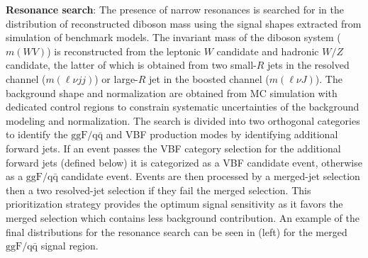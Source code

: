\textbf{Resonance search}: The presence of narrow resonances is searched for in the distribution of reconstructed diboson mass 
using the signal shapes extracted from simulation of benchmark models.
The invariant mass of the diboson system ($m(WV)$) is reconstructed from the leptonic $W$ candidate and hadronic $W/Z$ candidate, 
the latter of which is obtained from two small-$R$ jets in the resolved channel ($m(\ell\nu jj)$) or large-$R$ jet in the boosted 
channel ($m(\ell\nu J)$). 
The background shape and normalization are obtained from MC simulation with dedicated control regions to
constrain systematic uncertainties of the background modeling and normalization.
The search is divided into two orthogonal categories to identify the $\mathrm{ggF/q\bar{q}}$ and VBF production modes 
by identifying additional forward jets. If an event passes the VBF category selection for the additional forward jets 
(defined below) it is categorized as a VBF candidate event, otherwise as a $\mathrm{ggF/q\bar{q}}$ candidate event.
Events are then processed by a merged-jet selection then a two resolved-jet selection if they fail the merged selection. 
This prioritization strategy provides the optimum signal sensitivity as it favors the merged selection which contains 
less background contribution.
An example of the final distributions for the resonance search can be seen in  (left) 
for the merged $\mathrm{ggF/q\bar{q}}$ signal region. 

